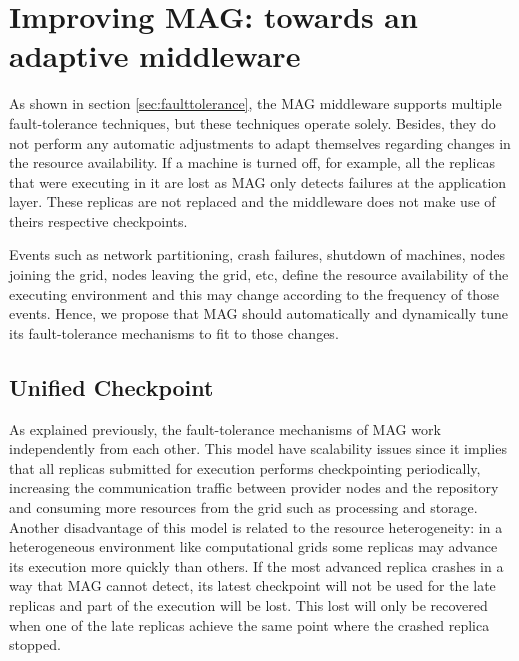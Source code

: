 \documentclass[times, 09pt, twocolumn]{article}
\begin{document}
\section{Improving MAG: towards an adaptive middleware}\label{sec:adapt}

As shown in section \ref{sec:faulttolerance}, the MAG middleware supports
multiple fault-tolerance techniques, but these techniques operate solely.
Besides, they do not perform any automatic adjustments to adapt themselves
regarding changes in the resource availability. If a machine is turned off, for
example, all the replicas that were executing in it are lost as MAG only
detects failures at the application layer. These replicas are not replaced and
the middleware does not make use of theirs respective checkpoints.


Events such as network partitioning, crash failures, shutdown of machines,
nodes joining the grid, nodes leaving the grid, etc, define the resource
availability of the executing environment and this may change according to the
frequency of those events. Hence, we propose that MAG should automatically and
dynamically tune its fault-tolerance mechanisms to fit to those changes.


\subsection{Unified Checkpoint}

As explained previously, the fault-tolerance mechanisms of MAG work
independently from each other. This model have scalability issues since it
implies that all replicas submitted for execution performs checkpointing
periodically, increasing the communication traffic between provider nodes and
the repository and consuming more resources from the grid such as processing
and storage. Another disadvantage of this model is related to the resource
heterogeneity: in a heterogeneous environment like computational grids some
replicas may advance its execution more quickly than others. If the most
advanced replica crashes in a way that MAG cannot detect, its latest checkpoint
will not be used for the late replicas and part of the execution will be
lost. This lost will only be recovered when one of the late replicas achieve
the same point where the crashed replica stopped. 
\end{document}
